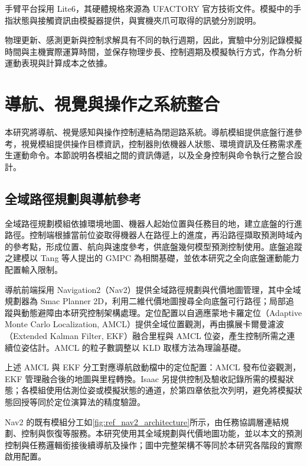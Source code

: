 手臂平台採用 Lite6，其硬體規格來源為 UFACTORY 官方技術文件\cite{ufactorylite6specs}。模擬中的手指狀態與接觸資訊由模擬器提供，與實機夾爪可取得的訊號分別說明。

物理更新、感測更新與控制求解具有不同的執行週期，因此，實驗中分別記錄模擬時間與主機實際運算時間，並保存物理步長、控制週期及模擬執行方式，作為分析運動表現與計算成本之依據。

\section{導航、視覺與操作之系統整合}
\label{sec:system_integration}

本研究將導航、視覺感知與操作控制連結為閉迴路系統。導航模組提供底盤行進參考，視覺模組提供操作目標資訊，控制器則依機器人狀態、環境資訊及任務需求產生運動命令。本節說明各模組之間的資訊傳遞，以及全身控制與命令執行之整合設計。

\subsection{全域路徑規劃與導航參考}
\label{subsec:global_planning_navigation_reference}

全域路徑規劃模組依據環境地圖、機器人起始位置與任務目的地，建立底盤的行進路徑。控制端根據當前位姿取得機器人在路徑上的進度，再沿路徑擷取預測時域內的參考點，形成位置、航向與速度參考，供底盤幾何模型預測控制使用。底盤追蹤之建模以 Tang 等人\cite{tang2024gmpc}提出的 GMPC 為相關基礎，並依本研究之全向底盤運動能力配置輸入限制。

導航前端採用 Navigation2（Nav2）提供全域路徑規劃與代價地圖管理\cite{macenski2020nav2}，其中全域規劃器為 Smac Planner 2D，利用二維代價地圖搜尋全向底盤可行路徑；局部追蹤與動態避障由本研究控制架構處理。定位配置以自適應蒙地卡羅定位（Adaptive Monte Carlo Localization, AMCL）提供全域位置觀測，再由擴展卡爾曼濾波（Extended Kalman Filter, EKF）融合里程與 AMCL 位姿，產生控制所需之連續位姿估計。AMCL 的粒子數調整以 KLD 取樣方法為理論基礎\cite{fox2003kld}。

上述 AMCL 與 EKF 分工對應導航啟動檔中的定位配置：AMCL 發布位姿觀測，EKF 管理融合後的地圖與里程轉換。Isaac 另提供控制及驗收記錄所需的模擬狀態；各模組使用估測位姿或模擬狀態的通道，於第四章依批次列明，避免將模擬狀態回授等同於定位演算法的精度驗證。

Nav2 的既有模組分工如\cref{fig:ref_nav2_architecture}所示，由任務協調層連結規劃、控制與恢復等服務。本研究使用其全域規劃與代價地圖功能，並以本文的預測控制與任務邏輯銜接後續導航及操作；圖中完整架構不等同於本研究各階段的實際啟用配置。

